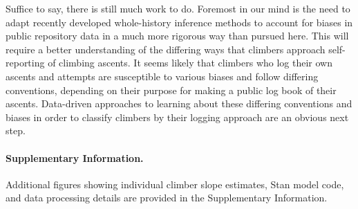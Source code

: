 \documentclass[12pt]{article}
\begin{document}
Suffice to say, there is still much work to do. Foremost in our mind is the need to adapt recently developed whole-history inference methods to account for biases in public repository data in a much more rigorous way than pursued here. This will require a better understanding of the differing ways that climbers approach self-reporting of climbing ascents. It seems likely that climbers who log their own ascents and attempts are susceptible to various biases and follow differing conventions, depending on their purpose for making a public log book of their ascents. Data-driven approaches to learning about these differing conventions and biases in order to classify climbers by their logging approach are an obvious next step.


\printglossaries

\paragraph{Supplementary Information.} Additional figures showing individual climber slope estimates, Stan model code, and data processing details are provided in the Supplementary Information.



\end{document}
